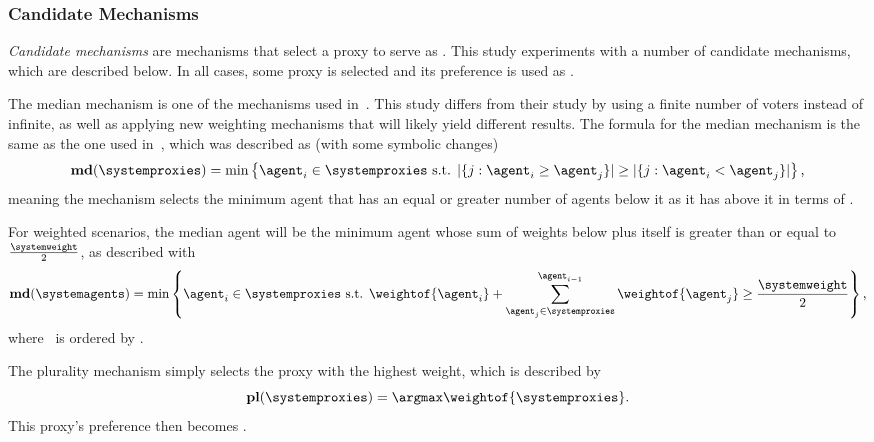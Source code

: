 \subsubsection{Candidate Mechanisms}\label{subsubsec:candidate-mechanisms}
\textit{Candidate mechanisms} are mechanisms that select a proxy to serve as
\systemtruth.  
This study experiments with a number of candidate mechanisms, which are
described below.
In all cases, some proxy is selected and its preference is used as \systemtruth.

\label{para:median}
The median mechanism is one of the mechanisms used in~\cite{Cohensius2017}.
This study differs from their study by using a finite number of voters instead of
infinite,
as well as applying new weighting mechanisms that will likely yield
different results.
The formula for the median mechanism is the same as the one used
in~\cite[para.~2.4]{Cohensius2017}, which was described as (with some
symbolic changes)
\begin{equation*}
    \textbf{md}(\systemproxies) =
    \min\left\{\agent_i \in \systemproxies \text{ s.t. }
    |\{j: \agent_i \geq \agent_j\}| \geq
    |\{j: \agent_i < \agent_j\}|
    \right\}
    \text{,}
\end{equation*}
meaning the mechanism selects the minimum agent that has an equal or greater
number of agents below it as it has above it in terms of \agenttruth.  

For weighted scenarios, the median agent will be the minimum agent whose sum of
weights below plus itself is greater than or equal to $\frac{\systemweight}{2}$,
as described with
\begin{equation}
    \textbf{md}(\systemagents) = \min\left\{
    \agent_i \in \systemproxies \text{ s.t. }
    \weightof{\agent_i} +
    \sum_{\agent_j \in \systemproxies}^{\agent_{i - 1}} \weightof{\agent_j}
    \geq \frac{\systemweight}{2}
    \right\}
    \text{,}\label{eq:median-mechanism}
\end{equation}
where \systemproxies\ is ordered by \agenttruth.

\label{para:plurality}
The plurality mechanism simply selects the proxy with the highest weight, which is
described by
\begin{equation}
    \textbf{pl}(\systemproxies) =
    \argmax \weightof{\systemproxies}
    \text{.}\label{eq:plurality-mechanism}
\end{equation}
This proxy's preference then becomes \systemtruth.

